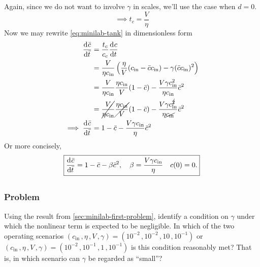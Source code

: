 \documentclass[12pt]{article}
\begin{document}
Again, since we do not want to involve $\gamma$ in scales, we'll use the case
when $d=0$.
\begin{equation*}
  \implies t_c = \frac{V}{\eta}
\end{equation*}
Now we may rewrite \cref{eq:minilab-tank} in dimensionless form
\begin{equation*}
  \begin{aligned}
    \frac{\mathrm{d}^{} {\bar{c}}}{\mathrm{d}{\bar{t}}^{}} &=
    \frac{t_c}{c_c}\frac{\mathrm{d}^{} {c}}{\mathrm{d}{t}^{}} \\
    &= \frac{V}{\eta c_{\text{in}}}
    \left(\frac{\eta}{V}(c_{\text{in}}-\bar{c}c_{\text{in}})-\gamma
    (\bar{c}c_{\text{in}})^2\right) \\
    &= \frac{V}{\eta c_{\text{in}}}\frac{\eta c_{\text{in}}}{V} (1-\bar{c}) -
    \frac{V\gamma c_{\text{in}}^2}{\eta c_{\text{in}}}\bar{c}^2 \\
    &= \cancel{\frac{V}{\eta c_{\text{in}}}} \cancel{\frac{\eta c_{\text{in}}}{V}}
    (1-\bar{c}) -
    \frac{V \gamma c_{\text{in}}^{\cancel{2}}}{\eta \cancel{c_{\text{in}}}}\bar{c}^2 \\
    \implies \frac{\mathrm{d}^{} {\bar{c}}}{\mathrm{d}{\bar{t}}^{}}
    &= 1-\bar{c} - \frac{V \gamma c_{\text{in}}}{\eta}\bar{c}^2 \\
  \end{aligned}
\end{equation*}
Or more concisely,
\begin{equation*} \boxed{
    \frac{\mathrm{d}^{} {\bar{c}}}{\mathrm{d}{\bar{t}}^{}} = 1 - \bar{c} - \beta\bar{c}^2,
    \quad \beta = \frac{V \gamma c_{\text{in}}}{\eta} \quad c(0)=0.
    }
\end{equation*}

\subsection{}
\label{sec:minilab-second-problem}
\subsubsection*{Problem}
Using the result from \cref{sec:minilab-first-problem}, identify a condition on
$\gamma$ under which the nonlinear term is expected to be negligible. In which
of the two operating scenarios
$(c_{\text{in}}\,,\eta\,,V\,,\gamma) = (10^{-2}\,,10^{-2}\,,10\,,10^{-1})$ or
$(c_{\text{in}}\,,\eta\,,V\,,\gamma) = (10^{-2}\,,10^{-1}\,,1\,,10^{-1})$
is this condition reasonably met? That is, in which scenario can $\gamma$ be
regarded as ``small''?
\end{document}

